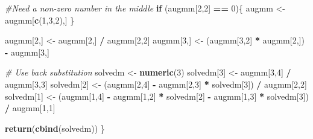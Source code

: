 \documentclass[]{article}
\newenvironment{Shaded}{\begin{snugshade}}{\end{snugshade}}
\newcommand{\KeywordTok}[1]{\textcolor[rgb]{0.13,0.29,0.53}{\textbf{#1}}}
\newcommand{\DecValTok}[1]{\textcolor[rgb]{0.00,0.00,0.81}{#1}}
\newcommand{\StringTok}[1]{\textcolor[rgb]{0.31,0.60,0.02}{#1}}
\newcommand{\CommentTok}[1]{\textcolor[rgb]{0.56,0.35,0.01}{\textit{#1}}}
\newcommand{\ControlFlowTok}[1]{\textcolor[rgb]{0.13,0.29,0.53}{\textbf{#1}}}
\newcommand{\OperatorTok}[1]{\textcolor[rgb]{0.81,0.36,0.00}{\textbf{#1}}}
\newcommand{\NormalTok}[1]{#1}
\begin{document}
\begin{Shaded}
\begin{Highlighting}[]
  \CommentTok{#Need a non-zero number in the middle}
  \ControlFlowTok{if}\NormalTok{ (augmm[}\DecValTok{2}\NormalTok{,}\DecValTok{2}\NormalTok{] }\OperatorTok{==}\StringTok{ }\DecValTok{0}\NormalTok{)\{}
\NormalTok{    augmm <-}\StringTok{ }\NormalTok{augmm[}\KeywordTok{c}\NormalTok{(}\DecValTok{1}\NormalTok{,}\DecValTok{3}\NormalTok{,}\DecValTok{2}\NormalTok{),]}
\NormalTok{  \}}
  
\NormalTok{  augmm[}\DecValTok{2}\NormalTok{,] <-}\StringTok{ }\NormalTok{augmm[}\DecValTok{2}\NormalTok{,] }\OperatorTok{/}\StringTok{ }\NormalTok{augmm[}\DecValTok{2}\NormalTok{,}\DecValTok{2}\NormalTok{]}
\NormalTok{  augmm[}\DecValTok{3}\NormalTok{,] <-}\StringTok{ }\NormalTok{(augmm[}\DecValTok{3}\NormalTok{,}\DecValTok{2}\NormalTok{] }\OperatorTok{*}\StringTok{ }\NormalTok{augmm[}\DecValTok{2}\NormalTok{,]) }\OperatorTok{-}\StringTok{ }\NormalTok{augmm[}\DecValTok{3}\NormalTok{,]}
  
  \CommentTok{# Use back substitution}
\NormalTok{  solvedm <-}\StringTok{ }\KeywordTok{numeric}\NormalTok{(}\DecValTok{3}\NormalTok{)}
\NormalTok{  solvedm[}\DecValTok{3}\NormalTok{] <-}\StringTok{ }\NormalTok{augmm[}\DecValTok{3}\NormalTok{,}\DecValTok{4}\NormalTok{] }\OperatorTok{/}\StringTok{ }\NormalTok{augmm[}\DecValTok{3}\NormalTok{,}\DecValTok{3}\NormalTok{]}
\NormalTok{  solvedm[}\DecValTok{2}\NormalTok{] <-}\StringTok{ }\NormalTok{(augmm[}\DecValTok{2}\NormalTok{,}\DecValTok{4}\NormalTok{] }\OperatorTok{-}\StringTok{ }\NormalTok{augmm[}\DecValTok{2}\NormalTok{,}\DecValTok{3}\NormalTok{] }\OperatorTok{*}\StringTok{ }\NormalTok{solvedm[}\DecValTok{3}\NormalTok{]) }\OperatorTok{/}\StringTok{ }\NormalTok{augmm[}\DecValTok{2}\NormalTok{,}\DecValTok{2}\NormalTok{]}
\NormalTok{  solvedm[}\DecValTok{1}\NormalTok{] <-}\StringTok{ }\NormalTok{(augmm[}\DecValTok{1}\NormalTok{,}\DecValTok{4}\NormalTok{] }\OperatorTok{-}\StringTok{ }\NormalTok{augmm[}\DecValTok{1}\NormalTok{,}\DecValTok{2}\NormalTok{] }\OperatorTok{*}\StringTok{ }\NormalTok{solvedm[}\DecValTok{2}\NormalTok{] }\OperatorTok{-}\StringTok{ }\NormalTok{augmm[}\DecValTok{1}\NormalTok{,}\DecValTok{3}\NormalTok{] }\OperatorTok{*}\StringTok{ }\NormalTok{solvedm[}\DecValTok{3}\NormalTok{]) }\OperatorTok{/}\StringTok{ }\NormalTok{augmm[}\DecValTok{1}\NormalTok{,}\DecValTok{1}\NormalTok{]}
  
  \KeywordTok{return}\NormalTok{(}\KeywordTok{cbind}\NormalTok{(solvedm))}
\NormalTok{\}}
\end{Highlighting}
\end{Shaded}
\end{document}
